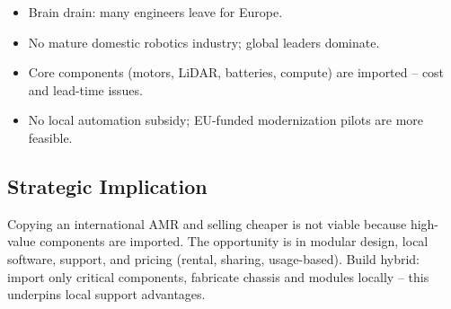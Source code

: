 \begin{itemize}
    \item Brain drain: many engineers leave for Europe.
    \item No mature domestic robotics industry; global leaders dominate.
    \item Core components (motors, LiDAR, batteries, compute) are imported -- cost and lead-time issues.
    \item No local automation subsidy; EU-funded modernization pilots are more feasible.
\end{itemize}

\subsection{Strategic Implication}

Copying an international AMR and selling cheaper is not viable because high-value components are imported. The opportunity is in modular design, local software, support, and pricing (rental, sharing, usage-based). Build hybrid: import only critical components, fabricate chassis and modules locally -- this underpins local support advantages.